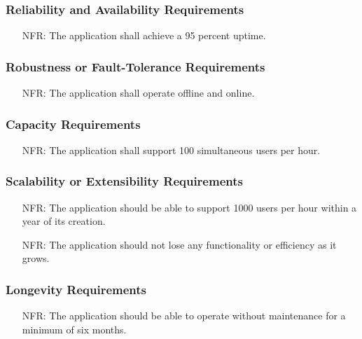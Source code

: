 \documentclass[12pt]{article}
\newcounter{nfrnum} %
\begin{document}
  \subsubsection{Reliability and Availability Requirements}
    \noindent\begin{itemize}
      \item[NFR\refstepcounter{nfrnum}\thenfrnum:] 
        The application shall achieve a 95 percent uptime.
    \end{itemize}
  \subsubsection{Robustness or Fault-Tolerance Requirements}
    \noindent\begin{itemize}
      \item[NFR\refstepcounter{nfrnum}\thenfrnum:] 
        The application shall operate offline and online.
    \end{itemize}
  \subsubsection{Capacity Requirements}
    \noindent\begin{itemize}
      \item[NFR\refstepcounter{nfrnum}\thenfrnum:] 
        The application shall support 100 simultaneous users per hour. 
    \end{itemize}
  \subsubsection{Scalability or Extensibility Requirements}
    \noindent\begin{itemize}
      \item[NFR\refstepcounter{nfrnum}\thenfrnum:] 
        The application should be able to support 1000 users per hour within a year of its creation.
      \item[NFR\refstepcounter{nfrnum}\thenfrnum:] 
        The application should not lose any functionality or efficiency as it grows.
    \end{itemize}
  \subsubsection{Longevity Requirements}
    \noindent\begin{itemize}
      \item[NFR\refstepcounter{nfrnum}\thenfrnum:] 
        The application should be able to operate without maintenance for a minimum of six months.
    \end{itemize}
\end{document}
